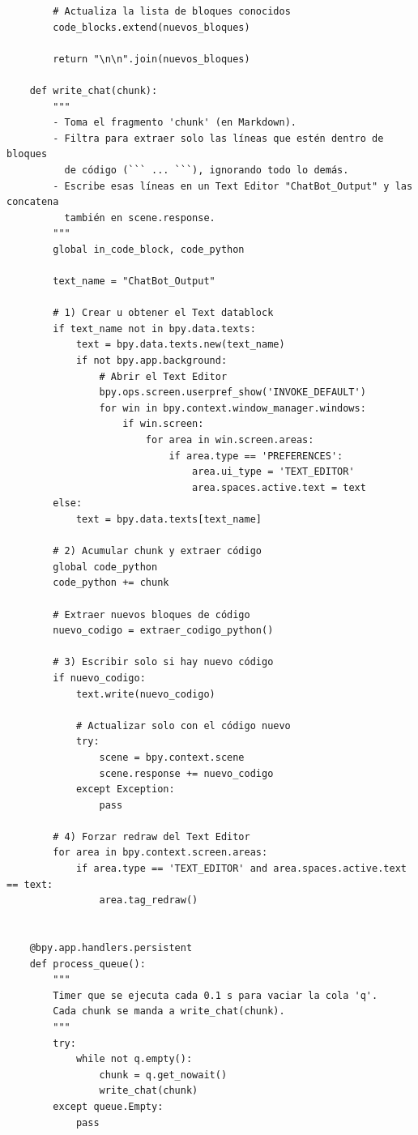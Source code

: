 \begin{verbatim}
        # Actualiza la lista de bloques conocidos
        code_blocks.extend(nuevos_bloques)
        
        return "\n\n".join(nuevos_bloques)
    
    def write_chat(chunk):
        """
        - Toma el fragmento 'chunk' (en Markdown).
        - Filtra para extraer solo las líneas que estén dentro de bloques
          de código (``` ... ```), ignorando todo lo demás.
        - Escribe esas líneas en un Text Editor "ChatBot_Output" y las concatena
          también en scene.response.
        """
        global in_code_block, code_python
    
        text_name = "ChatBot_Output"
    
        # 1) Crear u obtener el Text datablock
        if text_name not in bpy.data.texts:
            text = bpy.data.texts.new(text_name)
            if not bpy.app.background:
                # Abrir el Text Editor
                bpy.ops.screen.userpref_show('INVOKE_DEFAULT')
                for win in bpy.context.window_manager.windows:
                    if win.screen:
                        for area in win.screen.areas:
                            if area.type == 'PREFERENCES':
                                area.ui_type = 'TEXT_EDITOR'
                                area.spaces.active.text = text
        else:
            text = bpy.data.texts[text_name]
    
        # 2) Acumular chunk y extraer código
        global code_python
        code_python += chunk
        
        # Extraer nuevos bloques de código
        nuevo_codigo = extraer_codigo_python()
        
        # 3) Escribir solo si hay nuevo código
        if nuevo_codigo:
            text.write(nuevo_codigo)
            
            # Actualizar solo con el código nuevo
            try:
                scene = bpy.context.scene
                scene.response += nuevo_codigo
            except Exception:
                pass
    
        # 4) Forzar redraw del Text Editor
        for area in bpy.context.screen.areas:
            if area.type == 'TEXT_EDITOR' and area.spaces.active.text == text:
                area.tag_redraw()
    
    
    @bpy.app.handlers.persistent
    def process_queue():
        """
        Timer que se ejecuta cada 0.1 s para vaciar la cola 'q'.
        Cada chunk se manda a write_chat(chunk).
        """
        try:
            while not q.empty():
                chunk = q.get_nowait()
                write_chat(chunk)
        except queue.Empty:
            pass
    

\end{verbatim}
